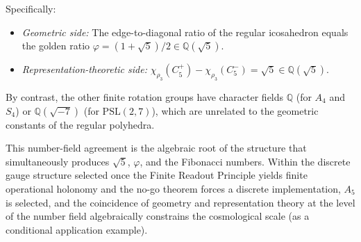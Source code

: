 \documentclass[sn-mathphys-num,Numbered]{sn-jnl}
\theoremstyle{thmstyleone}
\theoremstyle{thmstylethree}
\theoremstyle{thmstyletwo}
\newcommand{\Qsqrt}{\mathbb{Q}(\sqrt{5})}
\begin{document}
Specifically:
\begin{itemize}
  \item \textit{Geometric side:} The edge-to-diagonal ratio of the
    regular icosahedron equals the golden ratio
    $\varphi = (1+\sqrt{5})/2 \in \Qsqrt$.
  \item \textit{Representation-theoretic side:}
    $\chi_{\rho_3}(C_5^+) - \chi_{\rho_3}(C_5^-) = \sqrt{5} \in \Qsqrt$.
\end{itemize}
By contrast, the other finite rotation groups have character fields
$\mathbb{Q}$ (for $A_4$ and $S_4$) or $\mathbb{Q}(\sqrt{-7})$ (for
$\mathrm{PSL}(2,7)$), which are unrelated to the geometric constants of
the regular polyhedra.

This number-field agreement is the algebraic root of the structure that
simultaneously produces $\sqrt{5}$, $\varphi$, and the Fibonacci
numbers. Within the discrete gauge structure selected once the Finite Readout
Principle yields finite operational holonomy and the no-go theorem
forces a discrete implementation, $A_5$ is selected, and the
coincidence of geometry and representation theory at the level of the
number field algebraically constrains the cosmological scale (as a
conditional application example).
\end{document}
